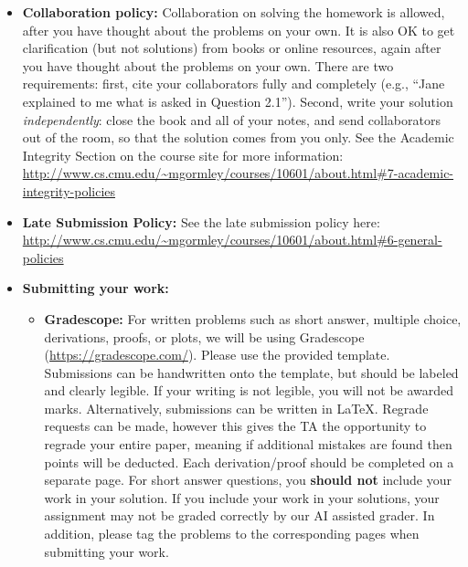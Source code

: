 \documentclass[12pt,addpoints,answers]{exam}
\begin{document}
\begin{itemize}
\item \textbf{Collaboration policy:} Collaboration on solving the homework is allowed, after you have thought about the problems on your own. It is also OK to get clarification (but not solutions) from books or online resources, again after you have thought about the problems on your own. There are two requirements: first, cite your collaborators fully and completely (e.g., ``Jane explained to me what is asked in Question 2.1''). Second, write your solution {\em independently}: close the book and all of your notes, and send collaborators out of the room, so that the solution comes from you only.  See the Academic Integrity Section on the course site for more information: \url{http://www.cs.cmu.edu/~mgormley/courses/10601/about.html#7-academic-integrity-policies}

\item\textbf{Late Submission Policy:} See the late submission policy here: \url{http://www.cs.cmu.edu/~mgormley/courses/10601/about.html#6-general-policies}

\item\textbf{Submitting your work:} 

\begin{itemize}

\item \textbf{Gradescope:} For written problems such as short answer, multiple choice, derivations, proofs, or plots, we will be using Gradescope (\url{https://gradescope.com/}). Please use the provided template. Submissions can be handwritten onto the template, but should be labeled and clearly legible. If your writing is not legible, you will not be awarded marks. Alternatively, submissions can be written in LaTeX. Regrade requests can be made, however this gives the TA the opportunity to regrade your entire paper, meaning if additional mistakes are found then points will be deducted.
Each derivation/proof should be completed on a separate page. For short answer questions, you \textbf{should not} include your work in your solution.  If you include your work in your solutions, your assignment may not be graded correctly by our AI assisted grader. In addition, please tag the problems to the corresponding pages when submitting your work.

\end{itemize}


\end{itemize}
\end{document}
